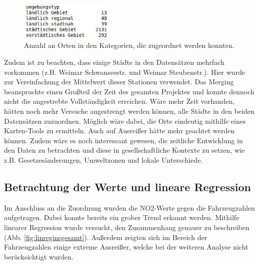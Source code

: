 \documentclass[11pt,a4paper,oneside,german]{article}
\begin{document}
	\begin{figure}
		\vspace{-20pt}
		\begin{center}
			\includegraphics[width=4.5cm]{Kategorien.jpg}
			\caption{Anzahl an Orten in den Kategorien, die zugeordnet werden konnten.}
			\label{fig:Kategorien}
		\end{center}
		\vspace{-20pt}
	\end{figure}
	
	Zudem ist zu beachten, dass einige Städte in den Datensätzen mehrfach vorkommen (z.B. Weimar Schwanseestr. und Weimar Steubenstr.). Hier wurde zur Vereinfachung der Mittelwert dieser Stationen verwendet. Das Merging beanspruchte einen Großteil der Zeit des gesamten Projektes und konnte dennoch nicht die angestrebte Vollständigkeit erreichen. Wäre mehr Zeit vorhanden, hätten noch mehr Versuche angestrengt werden können, alle Städte in den beiden Datensätzen zuzuordnen. Möglich wäre dabei, die Orte eindeutig mithilfe eines Karten-Tools zu ermitteln. Auch auf Ausreißer hätte mehr geachtet werden können. Zudem wäre es noch interessant gewesen, die zeitliche Entwicklung in den Daten zu betrachten und diese in gesellschaftliche Kontexte zu setzen, wie z.B. Gesetzesänderungen, Umweltzonen und lokale Unterschiede.
	
	\subsection{Betrachtung der Werte und lineare Regression}
	
	Im Anschluss an die Zuordnung wurden die NO2-Werte gegen die Fahrzeugzahlen aufgetragen. Dabei konnte bereits ein grober Trend erkannt werden. Mithilfe linearer Regression wurde versucht, den Zusammenhang genauer zu beschreiben (Abb. \ref{fig:linreginsgesamt}). Außerdem zeigten sich im Bereich der Fahrzeugzahlen einige extreme Ausreißer, welche bei der weiteren Analyse nicht berücksichtigt wurden.
	
\end{document}
